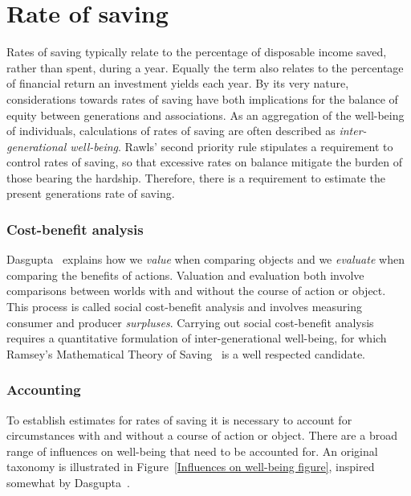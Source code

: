 \documentclass[11pt, oneside]{book}   	%
\begin{document}
\section{Rate of saving}
Rates of saving typically relate to the percentage of disposable income saved, rather than spent, during a year.
Equally the term also relates to the percentage of financial return an investment yields each year.
By its very nature, considerations towards rates of saving have both implications for the balance of equity between generations and associations.
As an aggregation of the well-being of individuals, calculations of rates of saving are often described as \emph{inter-generational well-being}.
Rawls' second priority rule stipulates a requirement to control rates of saving, so that excessive rates on balance mitigate the burden of those bearing the hardship.
Therefore, there is a requirement to estimate the present generations rate of saving.

\subsubsection{Cost-benefit analysis}

Dasgupta~\cite{pd2} explains how we \emph{value} when comparing objects and we \emph{evaluate} when comparing the benefits of actions.
Valuation and evaluation both involve comparisons between worlds with and without the course of action or object.
This process is called social cost-benefit analysis and involves measuring consumer and producer \emph{surpluses}.
Carrying out social cost-benefit analysis requires a quantitative formulation of inter-generational well-being, for which Ramsey's Mathematical Theory of Saving~\cite{fr1} is a well respected candidate.

\subsubsection{Accounting}

To establish estimates for rates of saving it is necessary to account for circumstances with and without a course of action or object. There are a broad range of influences on well-being that need to be accounted for. An original taxonomy is illustrated in Figure~\ref{Influences on well-being figure}, inspired somewhat by Dasgupta~\cite{pd3}.
\end{document}
